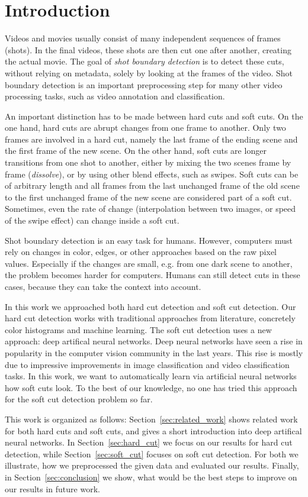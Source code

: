 \section{Introduction}
\label{sec:introduction}

Videos and movies usually consist of many independent sequences of frames (shots).
In the final videos, these shots are then cut one after another, creating the actual movie.
The goal of \emph{shot boundary detection} is to detect these cuts, without relying on metadata, solely by looking at the frames of the video.
Shot boundary detection is an important preprocessing step for many other video processing tasks, such as video annotation and classification.

An important distinction has to be made between hard cuts and soft cuts.
On the one hand, hard cuts are abrupt changes from one frame to another.
Only two frames are involved in a hard cut, namely the last frame of the ending scene and the first frame of the new scene.
On the other hand, soft cuts are longer transitions from one shot to another, either by mixing the two scenes frame by frame (\emph{dissolve}), or by using other blend effects, such as swipes.
Soft cuts can be of arbitrary length and all frames from the last unchanged frame of the old scene to the first unchanged frame of the new scene are considered part of a soft cut.
Sometimes, even the rate of change (interpolation between two images, or speed of the swipe effect) can change inside a soft cut.

Shot boundary detection is an easy task for humans.
However, computers must rely on changes in color, edges, or other approaches based on the raw pixel values.
Especially if the changes are small, e.g. from one dark scene to another, the problem becomes harder for computers.
Humans can still detect cuts in these cases, because they can take the context into account.

In this work we approached both hard cut detection and soft cut detection.
Our hard cut detection works with traditional approaches from literature, concretely color histograms and machine learning.
The soft cut detection uses a new approach: deep artifical neural networks.
Deep neural networks have seen a rise in popularity in the computer vision community in the last years.
This rise is mostly due to impressive improvements in image classification and video classification tasks.
In this work, we want to automatically learn via artificial neural networks how soft cuts look.
To the best of our knowledge, no one has tried this approach for the soft cut detection problem so far.

This work is organized as follows:
Section~\ref{sec:related_work} shows related work for both hard cuts and soft cuts, and gives a short introduction into deep artifical neural networks.
In Section~\ref{sec:hard_cut} we focus on our results for hard cut detection, while Section~\ref{sec:soft_cut} focuses on soft cut detection.
For both we illustrate, how we preprocessed the given data and evaluated our results.
Finally, in Section~\ref{sec:conclusion} we show, what would be the best steps to improve on our results in future work.
